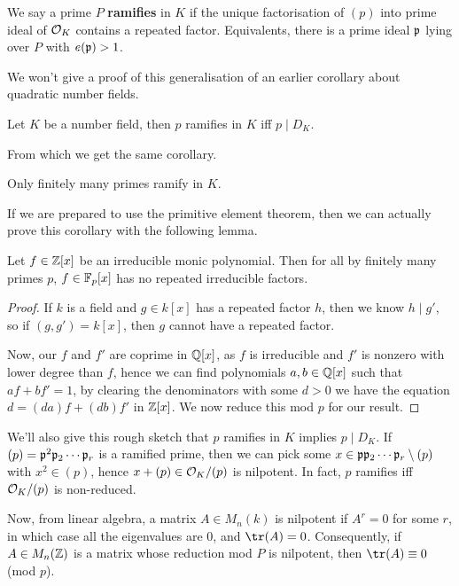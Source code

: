 \documentclass{article}
\begin{document}
\begin{definition}
    We say a prime $P$ \textbf{ramifies} in $K$ if the unique factorisation of $(p)$ into prime ideal of $\mathcal{O}_K$ contains a repeated factor. Equivalents, there is a prime ideal $\mathfrak{p}$ lying over $P$ with $e(\mathfrak{p})>1$.
\end{definition}

We won't give a proof of this generalisation of an earlier corollary about quadratic number fields.

\begin{theorem}
    Let $K$ be a number field, then $p$ ramifies in $K$ iff $p\mid D_K$.
\end{theorem}

From which we get the same corollary.

\begin{corollary}
    Only finitely many primes ramify in $K$.
\end{corollary}

If we are prepared to use the primitive element theorem, then we can actually prove this corollary with the following lemma.

\begin{lemma}
    Let $f\in\mathbb{Z}[x]$ be an irreducible monic polynomial. Then for all by finitely many primes $p$, $f\in\mathbb{F}_p[x]$ has no repeated irreducible factors.
    \begin{proof}
        If $k$ is a field and $g\in k[x]$ has a repeated factor $h$, then we know $h\mid g'$, so if $(g,g')=k[x]$, then $g$ cannot have a repeated factor. 

        Now, our $f$ and $f'$ are coprime in $\mathbb{Q}[x]$, as $f$ is irreducible and $f'$ is nonzero with lower degree than $f$, hence we can find polynomials $a,b\in\mathbb{Q}[x]$ such that $af+bf'=1$, by clearing the denominators with some $d>0$ we have the equation $d=(da)f+(db)f'$ in $\mathbb{Z}[x]$. We now reduce this mod $p$ for our result.
    \end{proof}
\end{lemma}

We'll also give this rough sketch that $p$ ramifies in $K$ implies $p\mid D_K$. If $(p)=\mathfrak{p}^2\mathfrak{p}_2\cdots\mathfrak{p}_r$ is a ramified prime, then we can pick some $x\in\mathfrak{p}\mathfrak{p}_2\cdots\mathfrak{p}_r\setminus(p)$ with $x^2\in(p)$, hence $x+(p)\in\mathcal{O}_K/(p)$ is nilpotent. In fact, $p$ ramifies iff $\mathcal{O}_K/(p)$ is non-reduced.

Now, from linear algebra, a matrix $A\in M_n(k)$ is nilpotent if $A^r=0$ for some $r$, in which case all the eigenvalues are $0$, and $\tr(A)=0$. Consequently, if $A\in M_n(\mathbb{Z})$ is a matrix whose reduction mod $P$ is nilpotent, then $\tr(A)\equiv 0$ (mod $p$).
\end{document}
